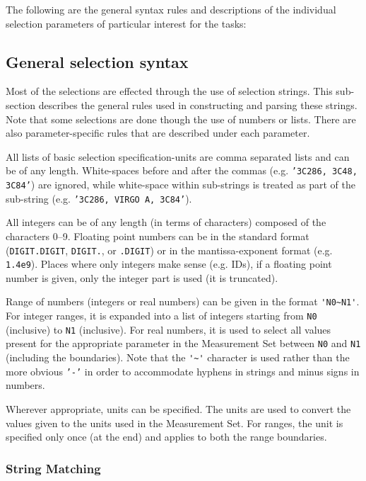 The following are the general syntax rules and descriptions of the
individual selection parameters of particular interest for the tasks:

\subsection{General selection syntax}
\label{section:io.selection.syntax}

Most of the selections are effected through the use of selection
strings.  This sub-section describes the general rules used in
constructing and parsing these strings.  Note that some selections
are done though the use of numbers or lists.  There are also 
parameter-specific rules that are described under each parameter.

All lists of basic selection specification-units are comma separated
lists and can be of any length.  White-spaces before and after the
commas (e.g. {\tt '3C286, 3C48, 3C84'}) are ignored, while white-space 
within sub-strings is treated as part of the sub-string 
(e.g. {\tt '3C286, VIRGO A, 3C84'}).

All integers can be of any length (in terms of characters) composed of
the characters 0--9.  Floating point numbers can be in the standard
format ({\tt DIGIT.DIGIT}, {\tt DIGIT.}, or {\tt .DIGIT}) or in the 
mantissa-exponent format (e.g. {\tt 1.4e9}).  Places where only 
integers make sense (e.g. IDs), if a floating point number is given, 
only the integer part is used (it is truncated).

Range of numbers (integers or real numbers) can be given in the format
{\verb!'N0~N1'!}.  For integer ranges, it is expanded into a list of integers
starting from {\tt N0} (inclusive) to {\tt N1} (inclusive).  For real numbers, it
is used to select all values present for the appropriate parameter in
the Measurement Set between {\tt N0} and {\tt N1} (including the
boundaries).  Note that the {\verb!'~'!} character is used rather than the
more obvious {\tt '-'} in order to accommodate hyphens in strings and
minus signs in numbers.

Wherever appropriate, units can be specified.  The
units are used to convert the values given to the units used in the
Measurement Set.  For ranges, the unit is specified only once (at
the end) and applies to both the range boundaries.

\subsubsection{String Matching}
\label{section:io.selection.syntax.string}

